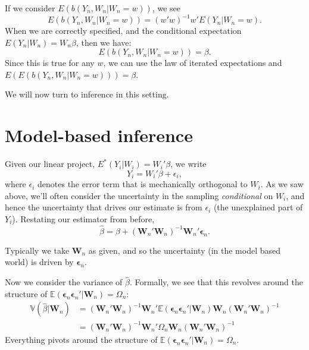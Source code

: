 \documentclass{tufte-handout}
\theoremstyle{break}
\begin{document}
If we consider $E(b(Y_{n}, W_{n}| W_{n} = w))$, we see
\begin{equation*}
  E(b(Y_{n}, W_{n}| W_{n} = w)) = (w'w)^{-1}w'E(Y_{n}| W_{n} = w).
\end{equation*}
When we are correctly specified, and the conditional expectation $E(Y_{n} | W_{n}) = W_{n}\beta$, then we have:
\begin{equation*}
  E(b(Y_{n}, W_{n}| W_{n} = w)) = \beta. 
\end{equation*}
Since this is true for any $w$, we can use the law of iterated expectations and $E(E(b(Y_{n}, W_{n}| W_{n} = w))) = \beta$.

We will now turn to inference in this setting.

\section{Model-based inference}

Given our linear project, $E^{*}(Y_{i} | W_{i}) = W_{i}'\beta$, we write 
\begin{equation*}
  Y_{i} = W_{i}'\beta + \epsilon_{i},
\end{equation*}
where $\epsilon_{i}$ denotes the error term that is mechanically orthogonal to $W_{i}$. As we saw above, we'll often consider the uncertainty in the sampling \emph{conditional} on $W_{i}$, and hence the uncertainty that drives our estimate is from $\epsilon_{i}$ (the unexplained part of $Y_{i}$). Restating our estimator from before, 
\begin{equation*}
  \hat{\beta} = \beta + (\mathbf{W}_{n}'\mathbf{W}_{n})^{-1}\mathbf{W}_{n}'\boldsymbol{\epsilon}_{n}.
\end{equation*}

Typically we take $\mathbf{W}_{n}$ as given, and so the uncertainty (in the model based world) is driven by $\boldsymbol{\epsilon}_{n}$.

Now we consider the variance of $\hat{\beta}$. Formally, we see that this revolves around the structure of $\mathbb{E}(\boldsymbol{\epsilon}_{n}\boldsymbol{\epsilon}_{n}'|\mathbf{W}_{n}) = \Omega_{n}$:
\begin{align}
  \mathbb{V}(\hat{\beta} |\mathbf{W}_{n}) &= (\mathbf{W}_{n}'\mathbf{W}_{n})^{-1}\mathbf{W}_{n}'\mathbb{E}(\boldsymbol{\epsilon}_{n}\boldsymbol{\epsilon}_{n}'|\mathbf{W}_{n})\mathbf{W}_{n} (\mathbf{W}_{n}'\mathbf{W}_{n})^{-1}\\
  &= (\mathbf{W}_{n}'\mathbf{W}_{n})^{-1}\mathbf{W}_{n}'\Omega_{n}\mathbf{W}_{n} (\mathbf{W}_{n}'\mathbf{W}_{n})^{-1}
\end{align}
Everything pivots around the structure of
$\mathbb{E}(\boldsymbol{\epsilon}_{n}\boldsymbol{\epsilon}_{n}'|\mathbf{W}_{n}) = \Omega_{n}$. 
\end{document}
